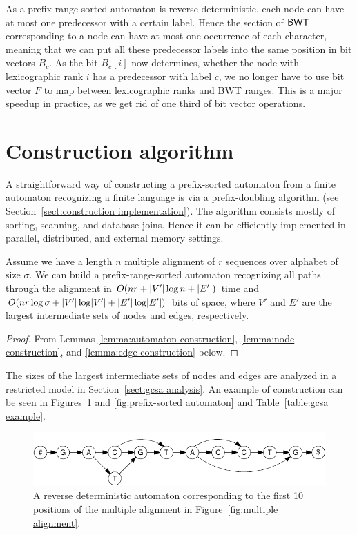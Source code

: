 As a prefix-range sorted automaton is reverse deterministic, each node can have at most one predecessor with a certain label. Hence the section of $\mathsf{BWT}$ corresponding to a node can have at most one occurrence of each character, meaning that we can put all these predecessor labels into the same position in bit vectors $B_{c}$. As the bit $B_{c}[i]$ now determines, whether the node with lexicographic rank $i$ has a predecessor with label $c$, we no longer have to use bit vector $F$ to map between lexicographic ranks and BWT ranges. This is a major speedup in practice, as we get rid of one third of bit vector operations.


\section{Construction algorithm}\label{sect:gcsa construction}

A straightforward way of constructing a prefix-sorted automaton from a finite automaton recognizing a finite language is via a prefix-doubling algorithm (see Section~\ref{sect:construction implementation}). The algorithm consists mostly of sorting, scanning, and database joins. Hence it can be efficiently implemented in parallel, distributed, and external memory settings.

\begin{theorem}
Assume we have a length $n$ multiple alignment of $r$ sequences over alphabet of size $\sigma$. We can build a prefix-range-sorted automaton recognizing all paths through the alignment in $O(nr + \lvert V' \rvert \log n + \lvert E' \rvert)$ time and $O(nr \log \sigma + \lvert V' \rvert \log \lvert V' \rvert + \lvert E' \rvert \log \lvert E' \rvert)$ bits of space, where $V'$ and $E'$ are the largest intermediate sets of nodes and edges, respectively.
\end{theorem}

\begin{proof}
From Lemmas \ref{lemma:automaton construction}, \ref{lemma:node construction}, and \ref{lemma:edge construction} below.
\end{proof}

The sizes of the largest intermediate sets of nodes and edges are analyzed in a restricted model in Section~\ref{sect:gcsa analysis}. An example of construction can be seen in Figures~\ref{fig:automaton} and \ref{fig:prefix-sorted automaton} and Table~\ref{table:gcsa example}.

\begin{figure}
\centerline{\includegraphics{figures/automaton.pdf}}
\caption{A reverse deterministic automaton corresponding to the first 10 positions of the multiple alignment in Figure~\ref{fig:multiple alignment}.} 
\label{fig:automaton}
\end{figure}

